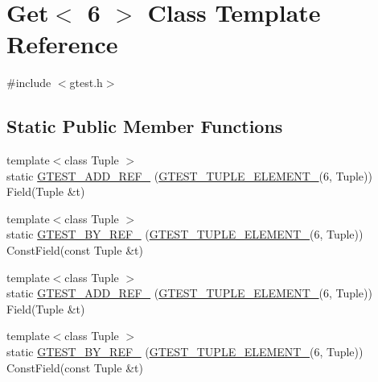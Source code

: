 \hypertarget{classstd_1_1tr1_1_1gtest__internal_1_1Get_3_016_01_4}{\section{\-Get$<$ 6 $>$ \-Class \-Template \-Reference}
\label{dd/dde/classstd_1_1tr1_1_1gtest__internal_1_1Get_3_016_01_4}
}


{\ttfamily \#include $<$gtest.\-h$>$}

\subsection*{\-Static \-Public \-Member \-Functions}
\begin{DoxyCompactItemize}
\item 
{\footnotesize template$<$class Tuple $>$ }\\static \hyperlink{classstd_1_1tr1_1_1gtest__internal_1_1Get_3_016_01_4_a6b9c1927c9b85a991706ff7e4316d8eb}{\-G\-T\-E\-S\-T\-\_\-\-A\-D\-D\-\_\-\-R\-E\-F\-\_\-} (\hyperlink{gtest-tuple_8h_a1b7f133d8aa02e0b7afed7b66781eeb7}{\-G\-T\-E\-S\-T\-\_\-\-T\-U\-P\-L\-E\-\_\-\-E\-L\-E\-M\-E\-N\-T\-\_\-}(6, \-Tuple)) \-Field(\-Tuple \&t)
\item 
{\footnotesize template$<$class Tuple $>$ }\\static \hyperlink{classstd_1_1tr1_1_1gtest__internal_1_1Get_3_016_01_4_a27539055e33c2663b5f56a859b94deae}{\-G\-T\-E\-S\-T\-\_\-\-B\-Y\-\_\-\-R\-E\-F\-\_\-} (\hyperlink{gtest-tuple_8h_a1b7f133d8aa02e0b7afed7b66781eeb7}{\-G\-T\-E\-S\-T\-\_\-\-T\-U\-P\-L\-E\-\_\-\-E\-L\-E\-M\-E\-N\-T\-\_\-}(6, \-Tuple)) \-Const\-Field(const \-Tuple \&t)
\item 
{\footnotesize template$<$class Tuple $>$ }\\static \hyperlink{classstd_1_1tr1_1_1gtest__internal_1_1Get_3_016_01_4_a6b9c1927c9b85a991706ff7e4316d8eb}{\-G\-T\-E\-S\-T\-\_\-\-A\-D\-D\-\_\-\-R\-E\-F\-\_\-} (\hyperlink{gtest-tuple_8h_a1b7f133d8aa02e0b7afed7b66781eeb7}{\-G\-T\-E\-S\-T\-\_\-\-T\-U\-P\-L\-E\-\_\-\-E\-L\-E\-M\-E\-N\-T\-\_\-}(6, \-Tuple)) \-Field(\-Tuple \&t)
\item 
{\footnotesize template$<$class Tuple $>$ }\\static \hyperlink{classstd_1_1tr1_1_1gtest__internal_1_1Get_3_016_01_4_a27539055e33c2663b5f56a859b94deae}{\-G\-T\-E\-S\-T\-\_\-\-B\-Y\-\_\-\-R\-E\-F\-\_\-} (\hyperlink{gtest-tuple_8h_a1b7f133d8aa02e0b7afed7b66781eeb7}{\-G\-T\-E\-S\-T\-\_\-\-T\-U\-P\-L\-E\-\_\-\-E\-L\-E\-M\-E\-N\-T\-\_\-}(6, \-Tuple)) \-Const\-Field(const \-Tuple \&t)
\end{DoxyCompactItemize}


